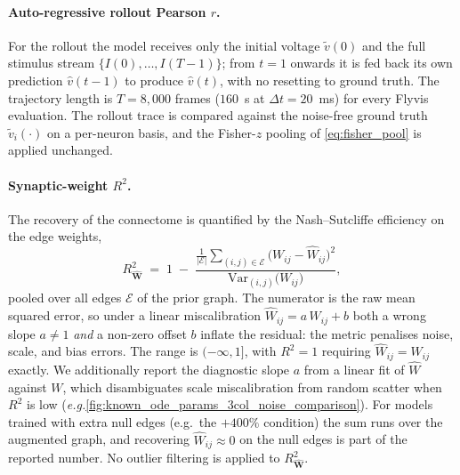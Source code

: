 \documentclass{article}
\def\eg{{\it e.g.}}
\begin{document}
\paragraph{Auto-regressive rollout Pearson $r$.}
For the rollout the model receives only the initial voltage
$\tilde v(0)$ and the full stimulus stream
$\{I(0),\ldots,I(T-1)\}$; from $t = 1$ onwards it is fed back its own
prediction $\hat v(t-1)$ to produce $\hat v(t)$, with no resetting to
ground truth. The trajectory length is $T = 8{,}000$ frames
($160$~s at $\Delta t = 20$~ms) for every Flyvis evaluation. The
rollout trace is compared against the noise-free ground truth
$\tilde v_i(\cdot)$ on a per-neuron basis, and the Fisher-$z$ pooling
of \cref{eq:fisher_pool} is applied unchanged.

\paragraph{Synaptic-weight $R^2$.}
The recovery of the connectome is quantified by the
Nash--Sutcliffe efficiency on the edge weights,
\begin{equation}
    R^2_{\hat{\mathbf{W}}}
        \;=\; 1 \;-\;
        \frac{\frac{1}{|\mathcal{E}|}\sum_{(i,j)\in\mathcal{E}}
              \big(W_{ij} - \hat{W}_{ij}\big)^2}
             {\mathrm{Var}_{(i,j)}\!\big(W_{ij}\big)},
    \label{eq:r2_identity}
\end{equation}
pooled over all edges $\mathcal{E}$ of the prior graph. The numerator
is the raw mean squared error, so under a linear miscalibration
$\hat{W}_{ij} = a\,W_{ij} + b$ both a wrong slope $a \neq 1$
\emph{and} a non-zero offset $b$ inflate the residual: the metric
penalises noise, scale, and bias errors. The range is
$(-\infty, 1]$, with $R^2 = 1$ requiring $\hat{W}_{ij} = W_{ij}$
exactly. We additionally report the diagnostic slope $a$ from a
linear fit of $\hat{W}$ against $W$, which disambiguates scale
miscalibration from random scatter when $R^2$ is low (\eg \cref{fig:known_ode_params_3col_noise_comparison}). For models
trained with extra null edges (e.g.\ the $+400\%$ condition) the sum
runs over the augmented graph, and recovering
$\hat{W}_{ij} \approx 0$ on the null edges is part of the
reported number. No outlier filtering is applied to
$R^2_{\hat{\mathbf{W}}}$.
\end{document}
